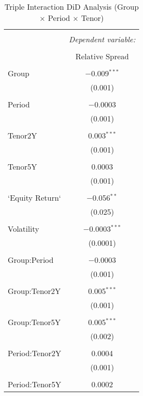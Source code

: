 
\begin{table}[!htbp] \centering 
  \caption{Triple Interaction DiD Analysis (Group × Period × Tenor)} 
  \label{} 
\begin{tabular}{@{\extracolsep{5pt}}lc} 
\\[-1.8ex]\hline 
\hline \\[-1.8ex] 
 & \multicolumn{1}{c}{\textit{Dependent variable:}} \\ 
\cline{2-2} 
\\[-1.8ex] & Relative Spread \\ 
\hline \\[-1.8ex] 
 Group & $-$0.009$^{***}$ \\ 
  & (0.001) \\ 
  & \\ 
 Period & $-$0.0003 \\ 
  & (0.001) \\ 
  & \\ 
 Tenor2Y & 0.003$^{***}$ \\ 
  & (0.001) \\ 
  & \\ 
 Tenor5Y & 0.0003 \\ 
  & (0.001) \\ 
  & \\ 
 `Equity Return` & $-$0.056$^{**}$ \\ 
  & (0.025) \\ 
  & \\ 
 Volatility & $-$0.0003$^{***}$ \\ 
  & (0.0001) \\ 
  & \\ 
 Group:Period & $-$0.0003 \\ 
  & (0.001) \\ 
  & \\ 
 Group:Tenor2Y & 0.005$^{***}$ \\ 
  & (0.001) \\ 
  & \\ 
 Group:Tenor5Y & 0.005$^{***}$ \\ 
  & (0.002) \\ 
  & \\ 
 Period:Tenor2Y & 0.0004 \\ 
  & (0.001) \\ 
  & \\ 
 Period:Tenor5Y & 0.0002 \\ 

\end{tabular}
\end{table}

